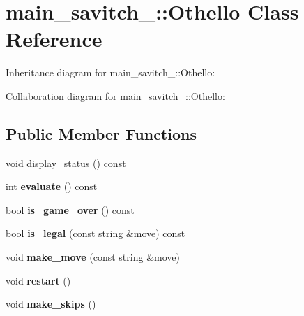\hypertarget{classmain__savitch__14_1_1Othello}{}\section{main\+\_\+savitch\+\_\+:\+:Othello Class Reference}
\label{classmain__savitch__14_1_1Othello}


Inheritance diagram for main\+\_\+savitch\+\_\+:\+:Othello\+:


Collaboration diagram for main\+\_\+savitch\+\_\+:\+:Othello\+:
\subsection*{Public Member Functions}
\begin{DoxyCompactItemize}
\item 
void \hyperlink{classmain__savitch__14_1_1Othello_a471f0e8f0e63ed32d764682f60110267}{display\+\_\+status} () const 
\item 
int {\bfseries evaluate} () const \hypertarget{classmain__savitch__14_1_1Othello_a1b3239a14882cbc7e7bd44c0b6828514}{}\label{classmain__savitch__14_1_1Othello_a1b3239a14882cbc7e7bd44c0b6828514}

\item 
bool {\bfseries is\+\_\+game\+\_\+over} () const \hypertarget{classmain__savitch__14_1_1Othello_a4387d20f953aab54025760ec3f72f7ca}{}\label{classmain__savitch__14_1_1Othello_a4387d20f953aab54025760ec3f72f7ca}

\item 
bool {\bfseries is\+\_\+legal} (const string \&move) const \hypertarget{classmain__savitch__14_1_1Othello_ab4fb0040d5e1dbe34c33fa11a82285cf}{}\label{classmain__savitch__14_1_1Othello_ab4fb0040d5e1dbe34c33fa11a82285cf}

\item 
void {\bfseries make\+\_\+move} (const string \&move)\hypertarget{classmain__savitch__14_1_1Othello_a1066b280efa5cb41039585669282fe06}{}\label{classmain__savitch__14_1_1Othello_a1066b280efa5cb41039585669282fe06}

\item 
void {\bfseries restart} ()\hypertarget{classmain__savitch__14_1_1Othello_abf872b8074bfa4c04119317dc3b39af2}{}\label{classmain__savitch__14_1_1Othello_abf872b8074bfa4c04119317dc3b39af2}

\item 
void {\bfseries make\+\_\+skips} ()\hypertarget{classmain__savitch__14_1_1Othello_a3177234195a490eef52343d957e64b5d}{}\label{classmain__savitch__14_1_1Othello_a3177234195a490eef52343d957e64b5d}


\end{DoxyCompactItemize}
